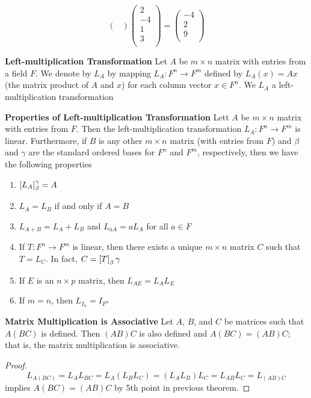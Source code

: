 \documentclass[11pt]{article}
\begin{document}
\begin{theorem*}
\[\begin{pmatrix}
        \end{pmatrix}
        \begin{pmatrix}
            2 \\ -4 \\ 1 \\ 3 \\
        \end{pmatrix}
        = 
        \begin{pmatrix}
            -4 \\ 2 \\ 9 \\ 
        \end{pmatrix}
    \]
\end{theorem*}


\begin{defn*}
    \textbf{Left-multiplication Transformation} Let $A$ be $m\times n$ matrix with entries from a field $F$. We denote by $L_A$ by mapping $L_A:F^n \to F^m$ defined by $L_A(x) = Ax$ (the matrix product of $A$ and $x$) for each column vector $x\in F^n$. We $L_A$ a left-multiplication transformation
\end{defn*}

\begin{theorem*}
    \textbf{Properties of Left-multiplication Transformation} Lett $A$ be $m\times n$ matrix with entries from $F$. Then the left-multiplication transformation $L_A: F^n \to F^m$ is linear. Furthermore, if $B$ is any other $m\times n$ matrix (with entries from $F$) and $\beta$ and $\gamma$ are the standard ordered bases for $F^n$ and $F^m$, respectively, then we have the following properties 
    \begin{enumerate}
        \item $\left[ L_A \right]_{\beta}^{\gamma} = A$ 
        \item $L_A = L_B$ if and only if $A=B$
        \item $L_{A+B} = L_A + L_B$ and $L_{aA} = aL_A$ for all $a\in F$
        \item If $T:F^n \to F^m$ is linear, then there exists a unique $m\times n$ matrix $C$ such that $T = L_C$. In fact, $C = \left[ T \right]_{\beta}{\gamma}$
        \item If $E$ is an $n\times p$ matrix, then $L_{AE} = L_A L_E$
        \item If $m=n$, then $L_{I_n} = I_{F^n}$
    \end{enumerate}
\end{theorem*}


\begin{theorem*}
    \textbf{Matrix Multiplication is Associative} Let $A$, $B$, and $C$ be matrices such that $A(BC)$ is defined. Then $(AB)C$ is also defined and $A(BC)=(AB)C$; that is, the matrix multiplication is associative. 
    \begin{proof}
        \[
            L_{A(BC)} = L_A L_{BC} = L_A(L_B L_C) = (L_A L_B) L_C = L_{AB}L_C = L_{(AB)C} 
        \]
        implies $A(BC) = (AB)C$ by 5th point in previous theorem. 
    \end{proof}
\end{theorem*}
\end{document}
